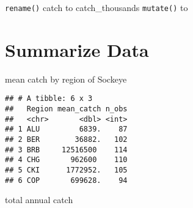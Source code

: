 \documentclass[]{article}
\newenvironment{Shaded}{\begin{snugshade}}{\end{snugshade}}
\newcommand{\DataTypeTok}[1]{\textcolor[rgb]{0.13,0.29,0.53}{#1}}
\newcommand{\DecValTok}[1]{\textcolor[rgb]{0.00,0.00,0.81}{#1}}
\newcommand{\KeywordTok}[1]{\textcolor[rgb]{0.13,0.29,0.53}{\textbf{#1}}}
\newcommand{\NormalTok}[1]{#1}
\newcommand{\OperatorTok}[1]{\textcolor[rgb]{0.81,0.36,0.00}{\textbf{#1}}}
\newcommand{\StringTok}[1]{\textcolor[rgb]{0.31,0.60,0.02}{#1}}
\begin{document}
\texttt{rename()} catch to catch\_thousands \texttt{mutate()} to

\begin{Shaded}
\end{Shaded}

\hypertarget{summarize-data}{%
\section{Summarize Data}\label{summarize-data}}

mean catch by region of Sockeye

\begin{Shaded}
\end{Shaded}

\begin{verbatim}
## # A tibble: 6 x 3
##   Region mean_catch n_obs
##   <chr>       <dbl> <int>
## 1 ALU         6839.    87
## 2 BER        36882.   102
## 3 BRB     12516500    114
## 4 CHG       962600    110
## 5 CKI      1772952.   105
## 6 COP       699628.    94
\end{verbatim}

total annual catch

\begin{Shaded}
\end{Shaded}
\end{document}
